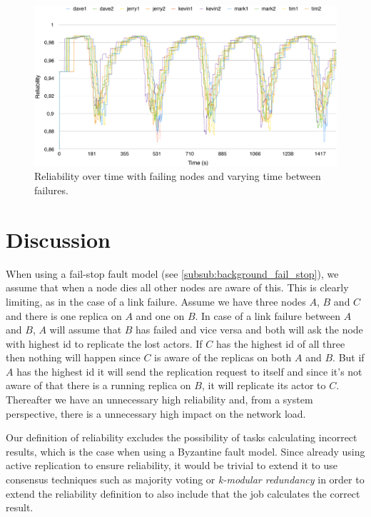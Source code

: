 \documentclass{cslthse-msc}
\begin{document}
\begin{figure}[!hbt]
\centering
\includegraphics[scale=0.5]{images/results/self_adaptive_node_rels.pdf}
\caption{Reliability over time with failing nodes and varying time between failures.} \label{fig:eval_self_adaptive_node_rels}
\end{figure}


\chapter{Discussion} \label{ch:discussion}

When using a fail-stop fault model (see \cref{subsub:background_fail_stop}), we assume that when a node dies all other nodes are aware of this. This is clearly limiting, as in the case of a link failure. Assume we have three nodes $A$, $B$ and $C$ and there is one replica on $A$ and one on $B$. In case of a link failure between $A$ and $B$, $A$ will assume that $B$ has failed and vice versa and both will ask the node with highest id to replicate the lost actors. If $C$ has the highest id of all three then nothing will happen since $C$ is aware of the replicas on both $A$ and $B$. But if $A$ has the highest id it will send the replication request to itself and since it's not aware of that there is a running replica on $B$, it will replicate its actor to $C$. Thereafter we have an unnecessary high reliability and, from a system perspective, there is a unnecessary high impact on the network load.

Our definition of reliability excludes the possibility of tasks calculating incorrect results, which is the case when using a Byzantine fault model. Since already using active replication to ensure reliability, it would be trivial to extend it to use consensus techniques such as majority voting or \emph{k-modular redundancy} in order to extend the reliability definition to also include that the job calculates the correct result.
\end{document}
